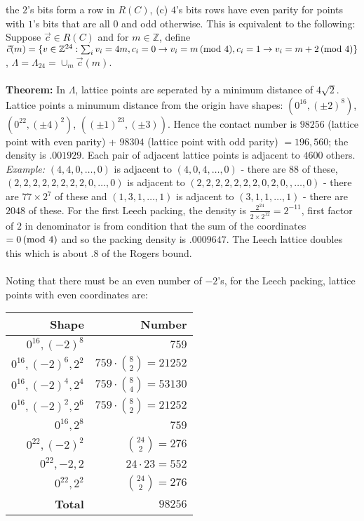 the $2$'s bits form a row in $R(C)$, (c) $4$'s bits rows have even parity for points
with $1$'s bits that are all $0$ and odd otherwise. This is equivalent to the following:
Suppose ${\vec c} \in R(C)$ and for $m \in {\mathbb Z}$, define
${\vec c}(m)= \{  
v \in {\mathbb Z}^{24}:  \sum_i v_i = 4m, 
c_i = 0 \rightarrow v_i = m \thinspace \textnormal{(mod } 4 \textnormal{)},
c_i = 1 \rightarrow v_i = m+2 \thinspace \textnormal{(mod } 4 \textnormal{)}
\}$,
$\Lambda = \Lambda_{24}= \cup_m {\vec c}(m)$.
\\
\\
{\bf Theorem:}   In $\Lambda$, lattice points are seperated by a minimum
distance of $4 {\sqrt 2}$.  Lattice points a minumum distance from the origin
have shapes: $(0^{16}, (\pm 2)^8)$, $(0^{22}, (\pm 4)^2)$, $((\pm 1)^{23}, (\pm 3))$.  
Hence the contact number is $98256$ (lattice point with even parity) + $98304$ 
(lattice point with odd parity) $= 196,560$;  
the density is $.001929$.  Each pair of adjacent lattice points is adjacent to $4600$
others. \emph{Example:} $(4,4, 0, \ldots, 0)$
is adjacent to $(4, 0, 4, \ldots , 0)$ - there are $88$ of these,
$(2,2,2,2,2,2,2,2,0, \ldots , 0)$ is adjacent to $(2,2,2,2,2,2,2,0,2, 0,, \ldots , 0)$
- there are $77 \times 2^7$ of these and
$(1,3,1, \ldots , 1)$ is adjacent to $(3,1,1, \ldots , 1)$ - there are $2048$ of these.
For the first Leech packing,
the density is ${\frac {2^{24}} { 2 \times 2^{12}}}= 2^{-11}$, 
first factor of $2$ in denominator is from condition that the sum of the
coordinates $= 0 \thinspace \textnormal{(mod } 4 \textnormal{)}$ and so the packing density is $.0009647$.  The
Leech lattice doubles this which is about $.8$ of the Rogers bound.
\\
\\
Noting that there must be an even number of $-2$'s,
for the Leech packing, lattice points with even coordinates are:
\begin{center}
\begin{tabular} {|r|r|}
\hline
{\bf Shape} & {\bf Number} \\
\hline
$0^{16}, (-2)^8$ & $759$ \\
$0^{16}, (-2)^6, 2^2$ & $759 \cdot {8 \choose 2}=21252$ \\
$0^{16}, (-2)^4, 2^4$ & $759 \cdot {8 \choose 4}=53130$ \\
$0^{16}, (-2)^2, 2^6$ & $759 \cdot {8 \choose 2}=21252$ \\
$0^{16}, 2^8$ & $759$ \\
$0^{22}, (-2)^2$ & ${24 \choose 2}=276$ \\
$0^{22}, -2, 2$ & $ 24 \cdot 23 =552$ \\
$0^{22}, 2^2$ & ${24 \choose 2}=276$ \\
\hline
{\bf Total} & $98256$\\
\hline
\end{tabular}
\end{center}

